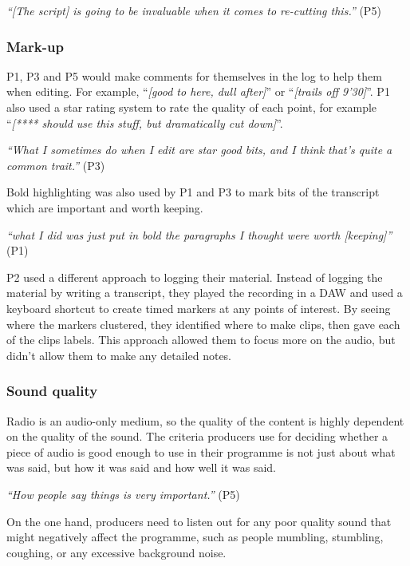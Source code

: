 \textit{``[The script] is going to be invaluable when it comes to re-cutting this.''} (P5)

\subsubsection{Mark-up}

P1, P3 and P5 would make comments for themselves in the log to help them when
editing. For example, ``\textit{[good to here, dull after]}'' or
``\textit{[trails off 9'30]}''. P1 also used a star rating system to rate the
quality of each point, for example ``\textit{[**** should use this stuff, but
  dramatically cut down]}''.

\textit{``What I sometimes do when I edit are star good bits, and I think
  that's quite a common trait.''} (P3)

Bold highlighting was also used by P1 and P3 to mark bits of the transcript
which are important and worth keeping.

\textit{``what I did was just put in bold the paragraphs I thought were worth
  [keeping]''} (P1)

P2 used a different approach to logging their material. Instead of logging the material by writing a transcript, they
played the recording in a DAW and used a keyboard shortcut to create timed markers at any points of interest. By seeing
where the markers clustered, they identified where to make clips, then gave each of the clips labels. This approach
allowed them to focus more on the audio, but didn't allow them to make any detailed notes.

\subsubsection{Sound quality}\label{sec:existing-quality}

Radio is an audio-only medium, so the quality of the content is highly dependent on the quality of the sound.  The
criteria producers use for deciding whether a piece of audio is good enough to use in their programme is not just about
what was said, but how it was said and how well it was said.

\textit{``How people say things is very important.''} (P5)

On the one hand, producers need to listen out for any poor quality sound that might negatively affect the programme,
such as people mumbling, stumbling, coughing, or any excessive background noise. 

